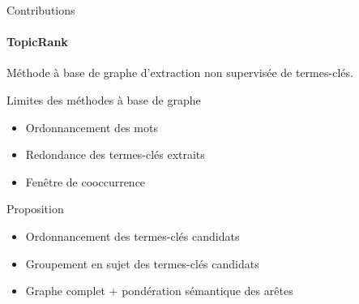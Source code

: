 \begin{frame}{Contributions}\framesubtitle{TopicRank}
  Méthode à base de graphe d'extraction non supervisée de termes-clés.

  \vspace{1em}

  \begin{alertblock}{Limites des méthodes à base de graphe}
    \begin{itemize}
      \item{Ordonnancement des mots}
      \item{Redondance des termes-clés extraits}
      \item{Fenêtre de cooccurrence}
    \end{itemize}
  \end{alertblock}

  \vspace{1em}

  \begin{block}{Proposition}
    \begin{itemize}
      \item{Ordonnancement des termes-clés candidats}
      \item{Groupement en sujet des termes-clés candidats}
      \item{Graphe complet $+$ pondération sémantique des arêtes}
    \end{itemize}
  \end{block}
\end{frame}

